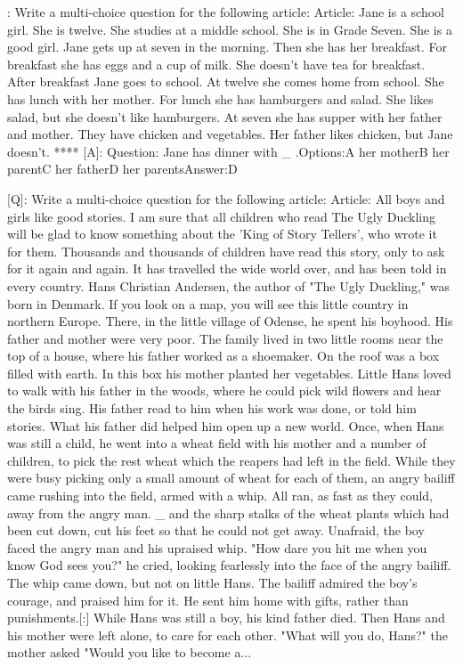 \documentclass{article}
\begin{document}
\begin{tcolorbox}[colframe=black,colback=white]
[Q]: Write a multi-choice question for the following article: Article: Jane is a school girl. She is twelve. She studies at a middle school. She is in Grade Seven. She is a good girl. Jane gets up at seven in the morning. Then she has her breakfast. For breakfast she has eggs and a cup of milk. She doesn't have tea for breakfast. After breakfast Jane goes to school. At twelve she comes home from school. She has lunch with her mother. For lunch she has hamburgers and salad. She likes salad, but she doesn't like hamburgers. At seven she has supper with her father and mother. They have chicken and vegetables. Her father likes chicken, but Jane doesn't.
****
[A]: Question: Jane has dinner with  \_ .Options:A her motherB her parentC her fatherD her parentsAnswer:D


[Q]: Write a multi-choice question for the following article: Article: All boys and girls like good stories. I am sure that all children who read The Ugly Duckling will be glad to know something about the 'King of Story Tellers', who wrote it for them. Thousands and thousands of children have read this story, only to ask for it again and again. It has travelled the wide world over, and has been told in every country. Hans Christian Andersen, the author of "The Ugly Duckling," was born in Denmark. If you look on a map, you will see this little country in northern Europe. There, in the little village of Odense, he spent his boyhood. His father and mother were very poor. The family lived in two little rooms near the top of a house, where his father worked as a shoemaker. On the roof was a box filled with earth. In this box his mother planted her vegetables. Little Hans loved to walk with his father in the woods, where he could pick wild flowers and hear the birds sing. His father read to him when his work was done, or told him stories. What his father did helped him open up a new world. Once, when Hans was still a child, he went into a wheat field with his mother and a number of children, to pick the rest wheat which the reapers  had left in the field. While they were busy picking only a small amount of wheat for each of them, an angry bailiff  came rushing into the field, armed with a whip. All ran, as fast as they could, away from the angry man. \_ and the sharp stalks  of the wheat plants which had been cut down, cut his feet so that he could not get away. Unafraid, the boy faced the angry man and his upraised whip. "How dare you hit me when you know God sees you?" he cried, looking fearlessly into the face of the angry bailiff. The whip came down, but not on little Hans. The bailiff admired the boy's courage, and praised him for it. He sent him home with gifts, rather than punishments.[:] While Hans was still a boy, his kind father died. Then Hans and his mother were left alone, to care for each other. "What will you do, Hans?" the mother asked "Would you like to become a...

\end{tcolorbox}
\end{document}
